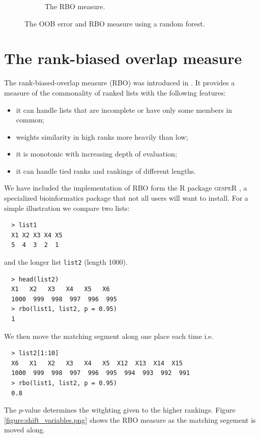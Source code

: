 \documentclass[11pt]{article}
\begin{document}
\begin{figure}[tbhp]
\begin{subfigure}[t]{0.5\linewidth}
    \caption{The RBO measure.}
    \label{figure:ranger_rbo_Stodden_simulation.png}
  \end{subfigure} 
  \caption{The  OOB error and RBO measure using a random forest.}
  \label{figure:ranger_error_and_rbo_Stodden_simulation.png}
\end{figure}

\section{The rank-biased overlap measure
  \label{section:the.Rank.biased.Overlap.measure}}

The rank-biased-overlap measure (RBO) was introduced in \cite{Webber2010}.
It provides a measure of the commonality of ranked lists with the following features:
\begin{itemize}
\item it can handle lists that are incomplete or have only some members in common;
\item weights similarity in high ranks more heavily than low;
\item it is monotonic with increasing depth of evaluation;
\item it can handle  tied ranks and rankings of different lengths.
\end{itemize}

We have included the implementation of RBO form the R package \textsc{gespeR} \cite[]{gespeR.2015},
a specialized bioinformatics package that not all users will want to install.
For a simple illustration we compare two lists:
\begin{lstlisting}
  > list1
  X1 X2 X3 X4 X5 
  5  4  3  2  1 
\end{lstlisting}
and the longer list \texttt{list2} (length 1000).
\begin{lstlisting}
  > head(list2)
  X1   X2   X3   X4   X5   X6 
  1000  999  998  997  996  995
  > rbo(list1, list2, p = 0.95)
  1
\end{lstlisting}
We then move the matching segment along one place each time i.e.
\begin{lstlisting}
  > list2[1:10]
  X6   X1   X2   X3   X4   X5  X12  X13  X14  X15 
  1000  999  998  997  996  995  994  993  992  991
  > rbo(list1, list2, p = 0.95)
  0.8
\end{lstlisting}
The $p$-value determines the witghting given to the higher rankings.
Figure \ref{figure:shift_variables.png} shows the RBO measure as the matching segement is moved along. 
\end{document}
